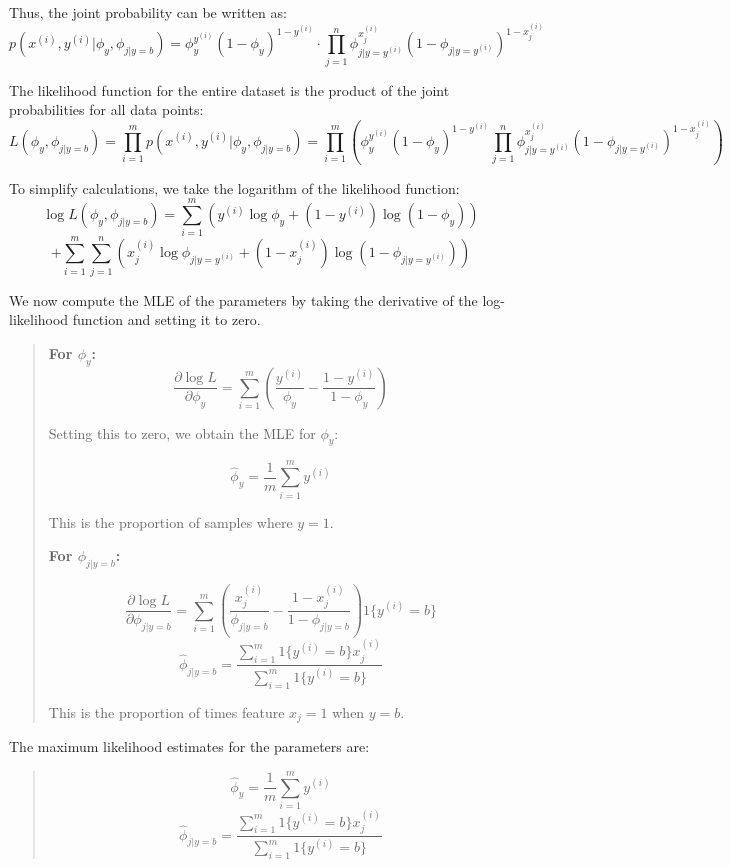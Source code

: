 \documentclass[12pt]{article}
\begin{document}
Thus, the joint probability can be written as:
\[
    p(x^{(i)}, y^{(i)} | \phi_y, \phi_{j|y=b}) = \phi_y^{y^{(i)}} (1 - \phi_y)^{1 - y^{(i)}} \cdot \prod_{j=1}^n \phi_{j|y=y^{(i)}}^{x_j^{(i)}} (1 - \phi_{j|y=y^{(i)}})^{1 - x_j^{(i)}}
\]

The likelihood function for the entire dataset is the product of the joint probabilities for all data points:
\[
    L(\phi_y, \phi_{j|y=b}) = \prod_{i=1}^m p(x^{(i)}, y^{(i)} | \phi_y, \phi_{j|y=b}) = \prod_{i=1}^m \left( \phi_y^{y^{(i)}} (1 - \phi_y)^{1 - y^{(i)}} \prod_{j=1}^n \phi_{j|y=y^{(i)}}^{x_j^{(i)}} (1 - \phi_{j|y=y^{(i)}})^{1 - x_j^{(i)}} \right)
\]

To simplify calculations, we take the logarithm of the likelihood function:
\[
\log L(\phi_y, \phi_{j|y=b}) = \sum_{i=1}^m \left( y^{(i)} \log \phi_y + (1 - y^{(i)}) \log (1 - \phi_y) \right)
\]
\[
+ \sum_{i=1}^m \sum_{j=1}^n \left( x_j^{(i)} \log \phi_{j|y=y^{(i)}} + (1 - x_j^{(i)}) \log (1 - \phi_{j|y=y^{(i)}}) \right)
\]

We now compute the MLE of the parameters by taking the derivative of the log-likelihood function and setting it to zero.

\begin{quote}
    \textbf{For \(\phi_y\):}
    \[
        \frac{\partial \log L}{\partial \phi_y} = \sum_{i=1}^m \left( \frac{y^{(i)}}{\phi_y} - \frac{1 - y^{(i)}}{1 - \phi_y} \right)
    \]

    Setting this to zero, we obtain the MLE for \(\phi_y\):

    \[
        \hat{\phi}_y = \frac{1}{m} \sum_{i=1}^m y^{(i)}
    \]
    
    This is the proportion of samples where \(y = 1\).

    \textbf{For \(\phi_{j|y=b}\):}

    \[
        \frac{\partial \log L}{\partial \phi_{j|y=b}} = \sum_{i=1}^m \left( \frac{x_j^{(i)}}{\phi_{j|y=b}} - \frac{1 - x_j^{(i)}}{1 - \phi_{j|y=b}} \right) 1\{y^{(i)} = b\}
    \]
    \[
        \hat{\phi}_{j|y=b} = \frac{\sum_{i=1}^m 1\{y^{(i)} = b\} x_j^{(i)}}{\sum_{i=1}^m 1\{y^{(i)} = b\}}
    \]

    This is the proportion of times feature \(x_j = 1\) when \(y = b\). 

\end{quote}

The maximum likelihood estimates for the parameters are:

\begin{quote}
    \[
    \hat{\phi}_y = \frac{1}{m} \sum_{i=1}^m y^{(i)}
    \]
    \[\hat{\phi}_{j|y=b} = \frac{\sum_{i=1}^m 1\{y^{(i)} = b\} x_j^{(i)}}{\sum_{i=1}^m 1\{y^{(i)} = b\}}
    \]
\end{quote}
\end{document}
